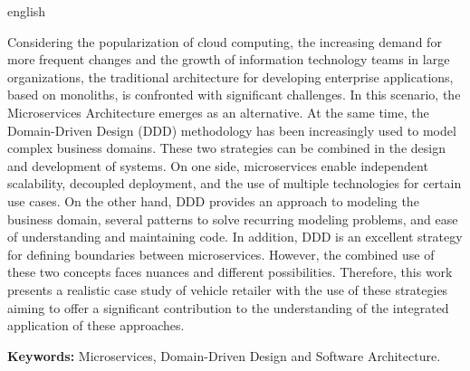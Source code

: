 \begin{resumo}[Abstract]
 \begin{otherlanguage*}{english}


Considering the popularization of cloud computing, the increasing demand for more frequent changes and the growth of information technology teams in large organizations, the traditional architecture for developing enterprise applications, based on monoliths, is confronted with significant challenges. In this scenario, the Microservices Architecture emerges as an alternative. At the same time, the Domain-Driven Design (DDD) methodology has been increasingly used to model complex business domains. These two strategies can be combined in the design and development of systems. On one side, microservices enable independent scalability, decoupled deployment, and the use of multiple technologies for certain use cases. On the other hand, DDD provides an approach to modeling the business domain, several patterns to solve recurring modeling problems, and ease of understanding and maintaining code. In addition, DDD is an excellent strategy for defining boundaries between microservices. However, the combined use of these two concepts faces nuances and different possibilities. Therefore, this work presents a realistic case study of vehicle retailer  with the use of these strategies aiming to offer a significant contribution to the understanding of the integrated application of these approaches.

\textbf{Keywords: } Microservices, Domain-Driven Design and Software Architecture.

\end{otherlanguage*}
\end{resumo}
